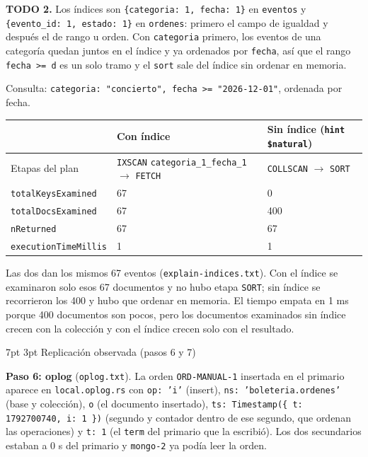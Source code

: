 \documentclass[10pt,letterpaper]{article}
\makeatletter
\renewcommand\section{\@startsection{section}{1}{\z@}%
  {7pt \@plus 2pt \@minus 1pt}{3pt}%
  {\normalfont\normalsize\bfseries\color{acc}}}
\makeatother
\begin{document}
\textbf{TODO 2.} Los índices son \texttt{\{categoria: 1, fecha: 1\}} en \texttt{eventos} y
\texttt{\{evento\_id: 1, estado: 1\}} en \texttt{ordenes}: primero el campo de igualdad y después el de
rango u orden. Con \texttt{categoria} primero, los eventos de una categoría quedan juntos en el índice y
ya ordenados por \texttt{fecha}, así que el rango \texttt{fecha >= d} es un solo tramo y el
\texttt{sort} sale del índice sin ordenar en memoria.

Consulta: \texttt{categoria: "concierto", fecha >= "2026-12-01"}, ordenada por fecha.

\begin{center}\footnotesize
\begin{tabular}{@{}lll@{}}
\toprule
 & \textbf{Con índice} & \textbf{Sin índice} (\texttt{hint \$natural}) \\
\midrule
Etapas del plan & \texttt{IXSCAN} \texttt{categoria\_1\_fecha\_1} $\to$ \texttt{FETCH} & \texttt{COLLSCAN} $\to$ \texttt{SORT} \\
\texttt{totalKeysExamined} & 67 & 0 \\
\texttt{totalDocsExamined} & 67 & 400 \\
\texttt{nReturned} & 67 & 67 \\
\texttt{executionTimeMillis} & 1 & 1 \\
\bottomrule
\end{tabular}
\end{center}

Las dos dan los mismos 67 eventos (\texttt{explain-indices.txt}). Con el índice se examinaron solo esos
67 documentos y no hubo etapa \texttt{SORT}; sin índice se recorrieron los 400 y hubo que ordenar en
memoria. El tiempo empata en 1 ms porque 400 documentos son pocos, pero los documentos examinados sin
índice crecen con la colección y con el índice crecen solo con el resultado.

\section{Replicación observada (pasos 6 y 7)}

\textbf{Paso 6: oplog} (\texttt{oplog.txt}). La orden \texttt{ORD-MANUAL-1} insertada en el primario
aparece en \texttt{local.oplog.rs} con \texttt{op: 'i'} (insert), \texttt{ns: 'boleteria.ordenes'}
(base y colección), \texttt{o} (el documento insertado), \texttt{ts: Timestamp(\{ t: 1792700740, i: 1 \})}
(segundo y contador dentro de ese segundo, que ordenan las operaciones) y \texttt{t: 1} (el \texttt{term}
del primario que la escribió). Los dos secundarios estaban a 0 s del primario y \texttt{mongo-2} ya podía
leer la orden.
\end{document}
